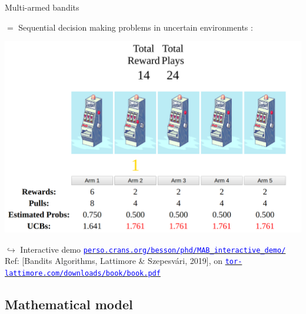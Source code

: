 \documentclass[11pt,english,ignorenonframetext,]{beamer}
\begin{document}
\begin{frame}{Multi-armed bandits}

  $=$ Sequential decision making problems in uncertain environments :

  \begin{center}
    \includegraphics[height=0.55\textheight]{figures/example_of_a_5_arm_bandit_problem.png}
  \end{center}

  \begin{tiny}
  $\hookrightarrow$ Interactive demo
    \href{https://perso.crans.org/besson/phd/MAB_interactive_demo/}{\textcolor{blue}{\texttt{perso.crans.org/besson/phd/MAB\_interactive\_demo/}}}\\
    Ref: [Bandits Algorithms, Lattimore \& Szepesv{\'a}ri, 2019],
    on \href{https://tor-lattimore.com/downloads/book/book.pdf}{\textcolor{blue}{\texttt{tor-lattimore.com/downloads/book/book.pdf}}}
  \end{tiny}

\end{frame}


\subsection{\hfill{}Mathematical model\hfill{}}
\end{document}
